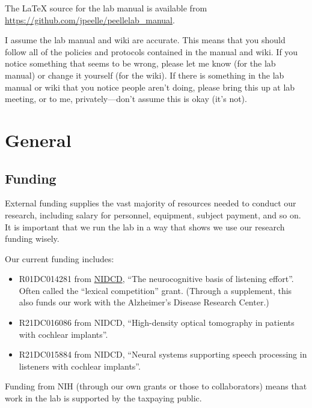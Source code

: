 \documentclass[letterpaper,12pt,oneside]{memoir}
\begin{document}
The LaTeX source for the lab manual is available from \url{https://github.com/jpeelle/peellelab_manual}.

 \begin{shaded}
\noindent I assume the lab manual and wiki are accurate. This means that you should follow all of the policies and protocols contained in the manual and wiki. If you notice something that seems to be wrong, please let me know (for the lab manual) or change it yourself (for the wiki). If there is something in the lab manual or wiki that you notice people aren't doing, please bring this up at lab meeting, or to me, privately---don't assume this is okay (it's not).
\end{shaded}


\chapter{General} %

\section{Funding}

External funding supplies the vast majority of resources needed to conduct our research, including salary for personnel, equipment, subject payment, and so on. It is important that we run the lab in a way that shows we use our research funding wisely.

Our current funding includes:

\begin{itemize}
\item R01DC014281 from \href{http://www.nidcd.nih.gov}{NIDCD}, ``The neurocognitive basis of listening effort''. Often called the ``lexical competition'' grant. (Through a supplement, this also funds our work with the Alzheimer's Disease Research Center.)

\item R21DC016086 from NIDCD, ``High-density optical tomography in patients with cochlear implants''.

\item R21DC015884 from NIDCD, ``Neural systems supporting speech processing in listeners with cochlear implants''.

\end{itemize}

Funding from NIH (through our own grants or those to collaborators) means that work in the lab is supported by the taxpaying public.
\end{document}
